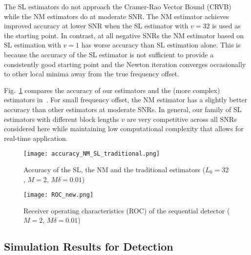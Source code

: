 The SL estimators do not approach the Cramer-Rao Vector Bound (CRVB)~\cite{Gini_98} while the NM
estimators do at moderate SNR. 
The NM estimator achieves improved accuracy at lower SNR
when the SL estimator with $v=32$ is used as the starting point. 
In contrast, at all negative SNRs the NM estimator based on SL estimation with $v=1$ has
worse accuracy than SL estimation alone.
This is because the accuracy of the SL estimator is not sufficient to
provide a consistently good starting point and the Newton iteration converges occasionally to 
other local minima away from the true frequency offset.

Fig.~\ref{fig:accuracy_NM_SL_traditional} compares the accuracy of our  estimators
and the (more complex) estimators in~\cite{kay_89,Fitz_94,Luise_Reggiannini_95}.
For small
frequency offset, the NM estimator has a slightly better accuracy than other estimators at moderate SNRs.
In general, our family of  SL estimators with different block lengths $v$
are very competitive across all SNRs considered here while maintaining
low computational complexity that allows for real-time application.

\begin{figure}[t]
    \centerline{\texttt{[image: accuracy\_NM\_SL\_traditional.png]}}
    \caption{Accuracy of the SL, the NM and the traditional estimators ($L_0=32$, $M=2$, $M\delta=0.01$)}
    \label{fig:accuracy_NM_SL_traditional}
    \end{figure}

\begin{figure}[t]
  \centerline{\texttt{[image: ROC\_new.png]}}
  \caption{Receiver operating characteristics (ROC) of the sequential detector ($M=2$, $M\delta=0.01$)}
  \label{fig:Receiver operating characteristics}
\end{figure}


\subsection{Simulation Results for Detection}


